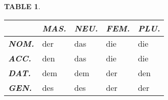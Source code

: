 \documentclass[a4paper,twocolumn,10pt]{article}
\newtheorem{mytable}{TABLE}[section]
\begin{document}

\nolinenumbers

\vspace{0.2cm}

\begin{table-bg}[width=\linewidth]{}

	\begin{table-title}[width=6.5cm]{}
		\captionsetup{labelformat=empty}
	\end{table-title}

	\begin{table-theword}
		\footnotesize \begin{mytable}\label{table:cases_definite_articles} \end{mytable}
	\end{table-theword}

	\begin{table-content}
	\begin{tabularx}
		{\textwidth}{l|XXXX}

		&
		\cellcolor{lightgray} \textbf{\textit{MAS.}}  &
		\cellcolor{lightgray} \textbf{\textit{NEU.}}  &
		\cellcolor{lightgray} \textbf{\textit{FEM.}}  &
		\cellcolor{lightgray} \textbf{\textit{PLU.}} \\

		\midrule

		\cellcolor{lightgray} \textbf{\textit{NOM.}} &
		\cellcolor{cell-lightpurple}  der            &
		\cellcolor{cell-lightorange}  das            &
		\cellcolor{cell-lightblue}    die            &
		\cellcolor{cell-lightblue}    die \\

		\cellcolor{lightgray} \textbf{\textit{ACC.}} &
		\cellcolor{cell-lightgreen}   den            &
		\cellcolor{cell-lightorange}  das            &
		\cellcolor{cell-lightblue}    die            &
		\cellcolor{cell-lightblue}    die \\

		\cellcolor{lightgray} \textbf{\textit{DAT.}} &
		\cellcolor{cell-lightred}    dem             &
		\cellcolor{cell-lightred}    dem             &
		\cellcolor{cell-lightpurple} der             &
		\cellcolor{cell-lightgreen}  den \\

		\cellcolor{lightgray} \textbf{\textit{GEN.}} &
		\cellcolor{cell-lightyellow} des               &
		\cellcolor{cell-lightyellow} des               &
		\cellcolor{cell-lightpurple} der               &
		\cellcolor{cell-lightpurple} der \\



	\end{tabularx}
	\end{table-content}

\end{table-bg}
\end{document}
